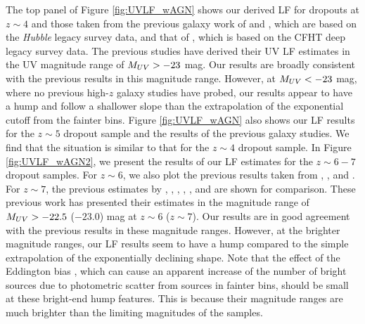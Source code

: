 \documentclass[]{pasj01}
\begin{document}
The top panel of Figure \ref{fig:UVLF_wAGN} 
shows our derived LF for dropouts at $z \sim 4$ 
and those taken from the previous galaxy work of 
\citet{2015ApJ...803...34B} 
and \citet{2015ApJ...810...71F}, 
which are based on the \textit{Hubble} legacy survey data, 
and that of \citet{2010A&A...523A..74V}, 
which is based on the CFHT deep legacy survey data. 
The previous studies have derived their UV LF estimates 
in the UV magnitude range of $M_{\rm UV} > - 23$ mag. 
Our results are broadly consistent with the previous results 
in this magnitude range. 
However, at $M_{\rm UV} < -23$ mag, 
where no previous high-$z$ galaxy studies have probed, 
our results appear to have a hump 
and follow a shallower slope than 
the extrapolation of the exponential cutoff from the fainter bins. 
Figure \ref{fig:UVLF_wAGN} also shows  
our LF results for the $z \sim 5$ dropout sample 
and the results of the previous galaxy studies. 
We find that the situation is similar to that for the $z \sim 4$ dropout sample. 
In Figure \ref{fig:UVLF_wAGN2}, 
we present the results of our LF estimates for the $z \sim 6-7$ dropout samples. 
For $z \sim 6$, we also plot the previous results 
taken from \citet{2015ApJ...803...34B}, 
\citet{2015ApJ...810...71F}, 
and \citet{2015MNRAS.452.1817B}. 
For $z \sim 7$, the previous estimates by  
\citet{2013MNRAS.432.2696M}, 
\citet{2013ApJ...768..196S}, 
\citet{2015ApJ...803...34B}, 
\citet{2015ApJ...810...71F}, 
\citet{2017MNRAS.466.3612B}, and \citet{2017arXiv170204867I} 
are shown for comparison. 
These previous work has presented their estimates 
in the magnitude range of $M_{\rm UV} > - 22.5$ ($-23.0$) mag at $z \sim 6$ ($z \sim 7$).  
Our results are in good agreement with the previous results in these magnitude ranges. 
However, at the brighter magnitude ranges, 
our LF results seem to have a hump 
compared to the simple extrapolation of the exponentially declining shape. 
% 
Note that the effect of the Eddington bias \citep{1913MNRAS..73..359E}, 
which can cause an apparent increase of the number of bright sources 
due to photometric scatter from sources in fainter bins, 
should be small at these bright-end hump features. 
This is because their magnitude ranges are much brighter than 
the limiting magnitudes of the samples. 
\end{document}
